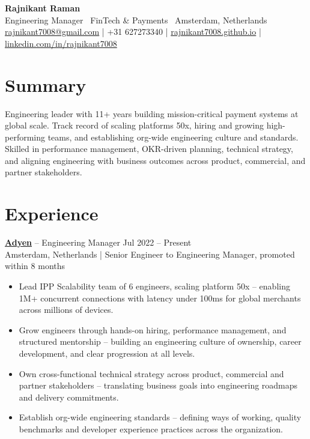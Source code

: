\documentclass[9pt,a4paper]{article}
\begin{document}
\begin{center}
  {\LARGE\bfseries Rajnikant Raman}\\[2pt]
  {\small Engineering Manager \textbar\ FinTech \& Payments \textbar\ Amsterdam, Netherlands}\\[2pt]
  {\small
    \href{mailto:rajnikant7008@gmail.com}{rajnikant7008@gmail.com}
    | +31 627273340
    | \href{https://rajnikant7008.github.io}{rajnikant7008.github.io}
    | \href{https://linkedin.com/in/rajnikant7008}{linkedin.com/in/rajnikant7008}
  }
\end{center}

\vspace{2pt}

\section{Summary}
{\small Engineering leader with 11+ years building mission-critical payment systems at global scale. Track record of scaling platforms 50x, hiring and growing high-performing teams, and establishing org-wide engineering culture and standards. Skilled in performance management, OKR-driven planning, technical strategy, and aligning engineering with business outcomes across product, commercial, and partner stakeholders.}

\section{Experience}

\textbf{\href{https://www.adyen.com}{Adyen}} -- Engineering Manager \hfill Jul 2022 -- Present\\
{\small\color{mid} Amsterdam, Netherlands | Senior Engineer to Engineering Manager, promoted within 8 months}
\begin{itemize}
  \item Lead IPP Scalability team of 6 engineers, scaling platform 50x -- enabling 1M+ concurrent connections with latency under 100ms for global merchants across millions of devices.
  \item Grow engineers through hands-on hiring, performance management, and structured mentorship -- building an engineering culture of ownership, career development, and clear progression at all levels.
  \item Own cross-functional technical strategy across product, commercial and partner stakeholders -- translating business goals into engineering roadmaps and delivery commitments.
  \item Establish org-wide engineering standards -- defining ways of working, quality benchmarks and developer experience practices across the organization.
\end{itemize}
\end{document}

